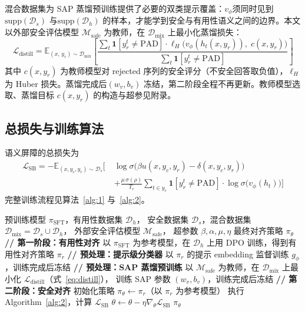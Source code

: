 \documentclass[lettersize,journal]{IEEEtran}
\begin{document}
混合数据集为 SAP 蒸馏预训练提供了必要的双类提示覆盖：$v_\phi$须同时见到 $\mathrm{supp}(\mathcal{D}_s)$ 与$\mathrm{supp}(\mathcal{D}_h)$ 的样本，才能学到安全与有用性语义之间的边界。本文以外部安全评估模型 $\mathcal{M}_{\text{safe}}$ 为教师，在 $\mathcal{D}_{\text{mix}}$ 上最小化蒸馏损失：
\begin{equation}\label{eq:distill}
    \mathcal{L}_{\text{distill}} =
    \mathbb{E}_{(x,\,y_r)\sim\mathcal{D}_{\text{mix}}}
    \!\left[
    \frac{\displaystyle\sum_{t}\mathbf{1}[y_r^t\neq\text{PAD}]
          \cdot\ell_H\!\bigl(v_\phi(h_t(x,y_r)),\;c(x,y_r)\bigr)}
         {\displaystyle\sum_t\mathbf{1}[y_r^t\neq\text{PAD}]}
    \right]
\end{equation}
其中 $c(x,y_r)$ 为教师模型对 rejected 序列的安全评分（不安全回答取负值），$\ell_H$ 为 Huber 损失\cite{huber1965robust}。蒸馏完成后$(w_v,b_v)$ 冻结，第二阶段全程不再更新。教师模型选取、蒸馏目标 $c(x,y_r)$ 的构造与超参见附录。

\subsection{总损失与训练算法}\label{sec:total-loss}
语义屏障的总损失为
\begin{equation}\label{eq:total-loss}
\begin{aligned}
\mathcal{L}_{\text{SB}} = -\mathbb{E}_{(x, y_c, y_r) \sim \mathcal{D}_s}
\Bigg[\;&\log\sigma\bigl(\beta u(x,y_c,y_r) - \delta(x,y_c,y_r)\bigr) \\
&+ \frac{\mu\,\sigma(\rho)}{T_r}\sum_{t \in y_r}
   \mathbf{1}[y_r^t\neq\text{PAD}]\cdot
   \log\sigma\bigl(v_\phi(h_t)\bigr)\Bigg]
\end{aligned}
\end{equation}
完整训练流程见算法~\ref{alg:1} 与~\ref{alg:2}。

\begin{algorithm}[h]
\caption{语义屏障两阶段训练流程}
\label{alg:1}
\begin{algorithmic}[1]
\REQUIRE 预训练模型 $\pi_{\text{SFT}}$，有用性数据集 $\mathcal{D}_h$，
         安全数据集 $\mathcal{D}_s$，混合数据集
         $\mathcal{D}_{\text{mix}}=\mathcal{D}_s\cup\mathcal{D}_h$，
         外部安全评估模型 $\mathcal{M}_{\text{safe}}$，
         超参数 $\beta,\alpha,\mu,\eta$
\ENSURE 最终对齐策略 $\pi_\theta$
\STATE \textbf{// 第一阶段：有用性对齐}
\STATE 以 $\pi_{\text{SFT}}$ 为参考模型，在 $\mathcal{D}_h$ 上用 DPO
       训练，得到有用性对齐策略 $\pi_r$
\STATE \textbf{// 预处理：提示级分类器}
\STATE 以 $\pi_r$ 的提示 embedding 监督训练 $g_\phi$，训练完成后冻结
\STATE \textbf{// 预处理：SAP 蒸馏预训练}
\STATE 以 $\mathcal{M}_{\text{safe}}$ 为教师，在 $\mathcal{D}_{\text{mix}}$
       上最小化 $\mathcal{L}_{\text{distill}}$（式~\ref{eq:distill}），
       训练 SAP 参数 $(w_v,b_v)$，训练完成后冻结
\STATE \textbf{// 第二阶段：安全对齐}
\STATE 初始化策略 $\pi_\theta \leftarrow \pi_r$（以 $\pi_r$ 为参考模型）
    \STATE 执行 Algorithm~\ref{alg:2}，计算 $\mathcal{L}_{\text{SB}}$
    \STATE $\theta \leftarrow \theta - \eta\nabla_\theta\mathcal{L}_{\text{SB}}$
\ENDFOR
\RETURN $\pi_\theta$
\end{algorithmic}
\end{algorithm}
\end{document}
